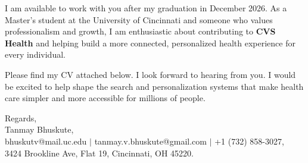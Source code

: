 \documentclass[11pt]{letter}
\begin{document}
\begin{letter}{}
I am available to work with you after my graduation in December 2026. As a Master's student at the University of Cincinnati and someone who values professionalism and growth, I am enthusiastic about contributing to \textbf{CVS Health} and helping build a more connected, personalized health experience for every individual.

Please find my CV attached below. I look forward to hearing from you. I would be excited to help shape the search and personalization systems that make health care simpler and more accessible for millions of people.

{\setlength{\parskip}{0pt}
Regards,\\
Tanmay Bhuskute,\\
bhuskutv@mail.uc.edu $\mid$ tanmay.v.bhuskute@gmail.com $\mid$ +1 (732) 858-3027,\\
3424 Brookline Ave, Flat 19, Cincinnati, OH 45220.
}

\end{letter}
\end{document}
